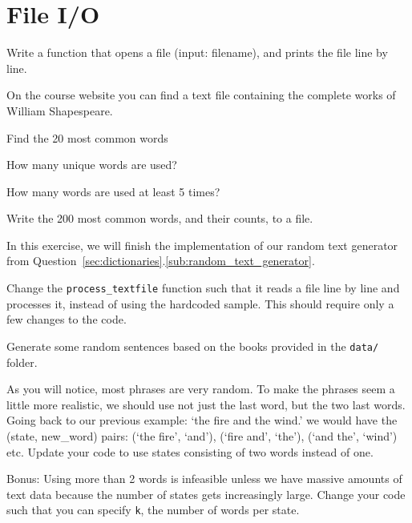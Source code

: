 \section{File I/O} %
\label{sec:file_i_o}
\begin{questions}

\label{sub:open}

    Write a function that opens a file (input: filename), and prints the
    file line by line.


\label{sub:wordcount}

    On the course website you can find a text file containing the complete works
    of William Shapespeare.

    \begin{parts}
        \item Find the 20 most common words
        \item How many unique words are used?
        \item How many words are used at least 5 times?
        \item Write the 200 most common words, and their counts, to a file.
    \end{parts}


\label{sub:random_text_generator_ii}

In this exercise, we will finish the implementation of our random text generator
from Question~\ref{sec:dictionaries}.\ref{sub:random_text_generator}.

Change the \texttt{process\_textfile} function such that it reads a file line by
line and processes it, instead of using the hardcoded sample.
This should require only a few changes to the code.

Generate some random sentences based on the books provided in the \texttt{data/}
folder.

As you will notice, most phrases are very random.
To make the phrases seem a little more realistic, we should use not just
the last word, but the two last words.
Going back to our previous example: `the fire and the wind.'
we would have the (state, new\_word) pairs: (`the fire', `and'), (`fire and', `the'),
(`and the', `wind') etc.
Update your code to use states consisting of two words instead of one.

Bonus: Using more than 2 words is infeasible unless we have massive amounts of text
data because the number of states gets increasingly large.
Change your code such that you can specify \texttt{k}, the number of words per state.


\end{questions}
